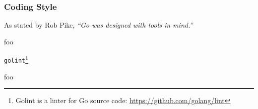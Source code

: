 
\subsubsection{Coding Style}

As stated by Rob Pike, \textit{``Go was designed with tools in mind.''} \cite{go_cover}












































foo

\texttt{golint}\footnote{Golint is a linter for Go source code: \url{https://github.com/golang/lint}}

%

foo
